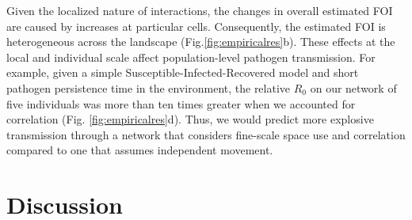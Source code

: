 \documentclass[letterpaper]{article}
\begin{document}
Given the localized nature of interactions, the changes in overall estimated FOI are caused by increases at particular cells. Consequently, the estimated FOI is heterogeneous across the landscape (Fig.\ref{fig:empiricalres}b). %
These effects at the local and individual scale affect population-level pathogen transmission. For example, given a simple Susceptible-Infected-Recovered model and short pathogen persistence time in the environment, the relative $R_0$ on our network of five individuals was more than ten times greater when we accounted for correlation (Fig. \ref{fig:empiricalres}d). Thus, we would predict more explosive transmission through a network that considers fine-scale space use and correlation compared to one that assumes independent movement.

\section*{Discussion}
\end{document}

